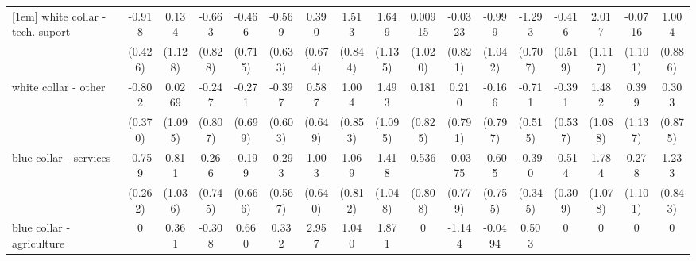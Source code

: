{\begin{tabular}{l*{16}{c}}
[1em]
white collar - tech. suport&      -0.918\sym{*}  &       0.134         &      -0.663         &      -0.466         &      -0.569         &       0.390         &       1.513         &       1.649         &     0.00915         &     -0.0323         &      -0.999         &      -1.293         &      -0.416         &       2.017         &     -0.0716         &       1.004         \\
                    &     (0.426)         &     (1.128)         &     (0.828)         &     (0.715)         &     (0.633)         &     (0.674)         &     (0.844)         &     (1.135)         &     (1.020)         &     (0.821)         &     (1.042)         &     (0.707)         &     (0.519)         &     (1.117)         &     (1.101)         &     (0.886)         \\
[1em]
white collar - other&      -0.802\sym{*}  &      0.0269         &      -0.247         &      -0.271         &      -0.397         &       0.587         &       1.004         &       1.493         &       0.181         &       0.210         &      -0.166         &      -0.711         &      -0.391         &       1.482         &       0.399         &       0.303         \\
                    &     (0.370)         &     (1.095)         &     (0.807)         &     (0.699)         &     (0.603)         &     (0.649)         &     (0.853)         &     (1.095)         &     (0.825)         &     (0.791)         &     (0.797)         &     (0.515)         &     (0.537)         &     (1.088)         &     (1.137)         &     (0.875)         \\
[1em]
blue collar - services&      -0.759\sym{**} &       0.811         &       0.266         &      -0.199         &      -0.293         &       1.003         &       1.069         &       1.418         &       0.536         &     -0.0375         &      -0.605         &      -0.390         &      -0.514         &       1.784         &       0.278         &       1.233         \\
                    &     (0.262)         &     (1.036)         &     (0.745)         &     (0.666)         &     (0.567)         &     (0.640)         &     (0.812)         &     (1.048)         &     (0.808)         &     (0.779)         &     (0.755)         &     (0.345)         &     (0.309)         &     (1.078)         &     (1.101)         &     (0.843)         \\
[1em]
blue collar - agriculture&           0         &       0.361         &      -0.308         &       0.660         &       0.332         &       2.957\sym{***}&       1.040         &       1.871         &           0         &      -1.144         &     -0.0494         &       0.503         &           0         &           0         &           0         &           0         \\

\end{tabular}}
